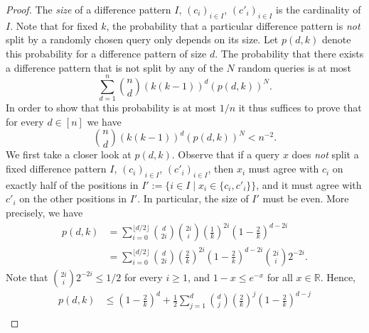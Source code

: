 \documentclass[english,a4paper,11pt]{article}
\newcommand{\R}{{\mathbb{R}}}
\newcommand{\comment}[1]{{\bf [#1]}}
\newcommand{\CW}[1]{\comment{\textcolor{blue}{CW: #1}}}
\begin{document}
{\begin{proof}

The \emph{size} of a difference pattern $I$, $(c_i)_{i \in I}$, $(c'_i)_{i \in I}$ is the cardinality of $I$.
Note that for fixed $k$, the probability that a particular difference pattern is \emph{not} split by a randomly chosen query only depends on its size. Let $p(d,k)$ denote this probability for a difference pattern of size $d$. 
The probability that there exists a difference pattern that is not split by any of the $N$ random queries is at most
\[
\sum_{d=1}^{n} \binom nd (k(k-1))^d (p(d,k))^N .
\]
In order to show that this probability is at most $1/n$ it thus suffices to prove that for every $d \in [n]$ we have
\begin{equation} \label{eq:non-adaptive-ultimate-goal}
\binom nd (k(k-1))^d (p(d,k))^N < n^{-2} .
\end{equation}
We first take a closer look at $p(d,k)$. 
Observe that %
if a query $x$ does \emph{not} split a fixed difference pattern $I$, $(c_i)_{i \in I}$, $(c'_i)_{i \in I}$, then $x_i$ must agree with $c_i$ on exactly half of the positions in $I':=\{ i \in I \mid x_i \in \{c_i,c'_i\} \}$, and it must agree with $c'_i$ on the other positions in $I'$. In particular, the size of $I'$ must be even. More precisely, we have
\begin{align*}
p(d,k) & = \sum_{i=0}^{\lfloor d/2 \rfloor} \binom d{2i} \binom{2i}i \left( \frac 1k \right)^{2i} \left(1 - \frac2k \right)^{d-2i} \\
& = \sum_{i=0}^{\lfloor d/2 \rfloor} \binom d{2i} \left( \frac 2k \right)^{2i} \left(1 - \frac2k \right)^{d-2i} \binom{2i}{i} 2^{-2i} .
\end{align*}
Note that $\binom{2i}i 2^{-2i} \le 1/2$ for every $i \ge 1$, and $1-x \leq e^{-x}$ for all $x\in \R$. Hence,
\begin{align*}
p(d,k) & \le \left( 1 - \frac 2k \right)^d + \frac12 \sum_{j=1}^{d} \binom dj \left( \frac2k \right)^{j} \left( 1 - \frac2k \right)^{d-j} \\

\end{align*}
\end{proof}}
\end{document}
